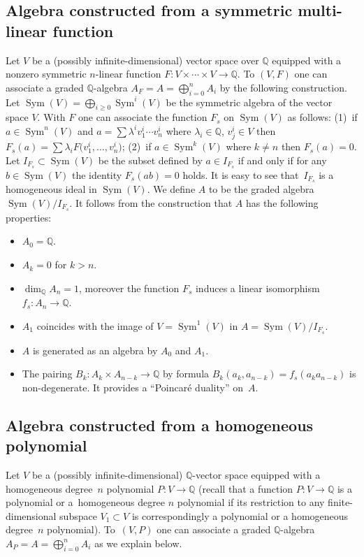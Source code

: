 \documentclass[10pt,a4paper]{amsart}
\def \Q{\mathbb{Q}}
\def \Sym{\operatorname{Sym}}
\numberwithin{equation}{section}
\theoremstyle{definition}
\begin{document}
\subsection{Algebra constructed from a symmetric multi-linear function} Let $V$ be a (possibly infinite-dimensional)
vector space over $\Q$ equipped with a nonzero symmetric $n$-linear function $F\colon V \times \cdots \times V \to \Q$. To $(V, F)$ one can associate a graded $\Q$-algebra $A _F= A = \bigoplus_{i=0}^n A_i$ by the following construction. Let $\Sym(V)= \bigoplus_{i \geq 0} \Sym^i(V)$ be the symmetric algebra of the vector space $V$. With $F$ one can associate the function $F_s$ on $\Sym(V)$ as follows: (1)~if $a\in \Sym^n(V)$ and $a=\sum \lambda^iv_1^i\cdots v^i_n$ where $\lambda_i\in \Q$, $v^i_j\in V$ then $F_s(a)=\sum\lambda_i F\big(v_1^i, \ldots, v^i_n\big)$; (2)~if $a\in \Sym^k(V)$ where $k \neq n$ then $F_s(a)=0$. Let $I_{F_s}\subset \Sym(V)$ be the subset defined by $a\in I_{F_s}$ if and only if for any $b\in \Sym(V)$ the identity $F_s(ab)=0$ holds. It is easy to see that~$I_{F_s}$ is a homogeneous ideal in $\Sym(V)$. We define $A$ to be the graded algebra $\Sym(V) / I_{F_s}$. It follows from the construction that $A$ has the following properties:
\begin{itemize}\itemsep=0pt
\item $A_0=\Q$.
\item $A_k=0$ for $k>n$.
\item $\dim _{\Q}A_n=1$, moreover the function $F_s$ induces a linear isomorphism $f_s\colon A_n \rightarrow \Q$.
\item $A_1$ coincides with the image of $V=\Sym^1(V)$ in $A=\Sym(V)/I_{F_s}$.
\item $A$ is generated as an algebra by $A_0$ and $A_1$.
\item The pairing $B_k\colon A_k\times A_{n-k}\rightarrow \Q$ by formula $B_k(a_k, a_{n-k})=f_s(a_k a_{n-k})$ is non-degenerate. It provides a ``Poincar\'e duality'' on~$A$.
\end{itemize}

\subsection{Algebra constructed from a homogeneous polynomial}
Let $V$ be a (possibly infinite-dimensional) $\Q$-vector space equipped with a homogeneous deg\-ree~$n$ polynomial $P\colon V \to \Q$ (recall that a function $P\colon V \to \Q$ is a polynomial or a~homogeneous degree $n$ polynomial if its restriction to any finite-dimensional subspace $V_1\subset V$ is correspondingly a polynomial or a homogeneous degree~$n$ polynomial). To~$(V, P)$ one can associate a graded $\Q$-algebra $A_P = A = \bigoplus_{i=0}^n A_i$ as we explain below.
\end{document}

